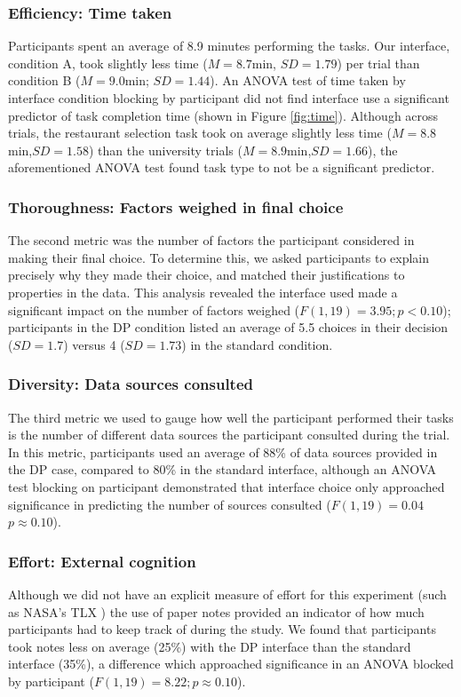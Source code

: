\documentclass{sigchi}
\begin{document}
\subsubsection{Efficiency: Time taken}
Participants spent an average of 8.9 minutes performing the tasks. Our interface, condition A, took slightly less time ($M=8.7$min, $SD=1.79$) per trial than condition B ($M=9.0$min; $SD=1.44$).  An ANOVA test of time taken by interface condition blocking by participant did not find interface use a significant predictor of task completion time (shown in Figure \ref{fig:time}).  Although across trials, the restaurant selection task took on average slightly less time ($M=8.8$min,$SD=1.58$) than the university trials ($M=8.9$min,$SD=1.66$), the aforementioned ANOVA test found task type to not be a significant predictor.

\subsubsection{Thoroughness: Factors weighed in final choice}
The second metric was the number of factors the participant considered in making their final choice. To determine this, we asked participants to explain precisely why they made their choice, and matched their justifications to properties in the data.  This analysis revealed the interface used made a significant impact on the number of factors weighed ($F(1,19)=3.95; p<0.10$); participants in the DP condition listed an average of 5.5 choices in their decision ($SD=1.7$) versus 4 ($SD=1.73$) in the standard condition.

\subsubsection{Diversity: Data sources consulted}
The third metric we used to gauge how well the participant performed their tasks is the number of different data sources the participant consulted during the trial. In this metric, participants used an average of 88\% of data sources provided in the DP case, compared to 80\% in the standard interface, although an ANOVA test blocking on participant demonstrated that interface choice only approached significance in predicting the number of sources consulted ($F(1,19)=0.04$ $p\approx0.10$).

\subsubsection{Effort: External cognition}
Although we did not have an explicit measure of effort for this experiment (such as NASA's TLX \cite{tlx}) the use of paper notes provided an indicator of how much participants had to keep track of during the study.  We found that participants took notes less on average (25\%) with the DP interface than the standard interface (35\%), a difference which approached significance in an ANOVA blocked by participant ($F(1,19)= 8.22; p\approx0.10$).
\end{document}
